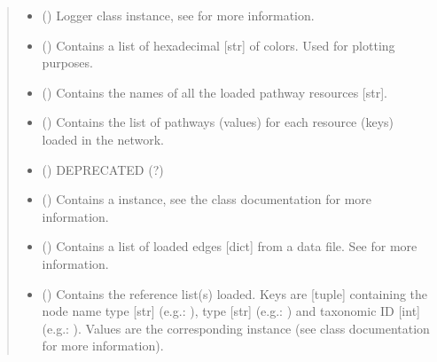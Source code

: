 \documentclass[letterpaper,10pt,english]{sphinxmanual}
\begin{document}
\begin{fulllineitems}
\begin{quote}
\begin{description}
\begin{itemize}
\item {} 
 () \textendash{} Logger class instance, see  for more
information.

\item {} 
 () \textendash{} Contains a list of hexadecimal {[}str{]} of colors. Used for
plotting purposes.

\item {} 
 () \textendash{} Contains the names of all the loaded pathway resources {[}str{]}.

\item {} 
 () \textendash{} Contains the list of pathways (values) for each resource (keys)
loaded in the network.

\item {} 
 () \textendash{} DEPRECATED (?)

\item {} 
 () \textendash{} Contains a 
instance, see the class documentation for more information.

\item {} 
 () \textendash{} Contains a list of loaded edges {[}dict{]} from a data file. See
{\hyperref[\detokenize{main:pypath.main.PyPath.read_data_file}]{}} for more information.

\item {} 
 () \textendash{} Contains the reference list(s) loaded. Keys are {[}tuple{]}
containing the node name type {[}str{]} (e.g.: ), type
{[}str{]} (e.g.: ) and taxonomic ID {[}int{]} (e.g.:
). Values are the corresponding
 instance (see class
documentation for more information).


\end{itemize}
\end{description}
\end{quote}
\end{fulllineitems}
\end{document}
